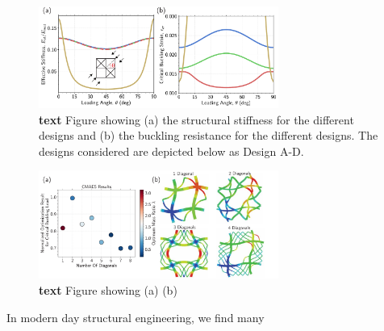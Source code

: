\documentclass[9pt,twocolumn,twoside]{fernandes_paper}
\begin{document}
\begin{figure}[ht]
	\captionsetup{width=0.8\textwidth}
	\begin{center}
		\includegraphics[width=0.7\textwidth]{Fig3}
	\end{center}
	\caption{\textbf{text} Figure showing (a) the structural stiffness for the different designs and (b) the buckling resistance for the different designs. The designs considered are depicted below as Design A-D.} \label{Fig3}
\end{figure}

\begin{figure}[ht]
	\captionsetup{width=0.8\textwidth}
	\begin{center}
		\includegraphics[width=0.7\textwidth]{Fig4}
	\end{center}
	\caption{\textbf{text} Figure showing (a) (b)} \label{Fig4}
\end{figure}


In modern day structural engineering, we find many 
\end{document}

